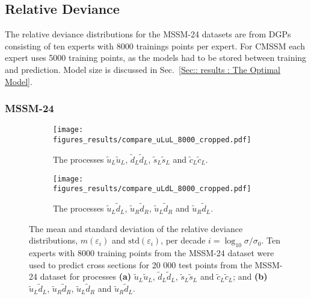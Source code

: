\documentclass[twoside,english]{uiofysmaster}
\begin{document}
{\subsection{Relative Deviance}\label{Sec:: results : Relative Deviance}

The relative deviance distributions for the MSSM-24 datasets are from DGPs consisting of ten experts with 8000 trainings points per expert. For CMSSM each expert uses 5000 training points, as the models had to be stored between training and prediction. Model size is discussed in Sec.~\ref{Sec:: results : The Optimal Model}.

\subsubsection{MSSM-24}

\begin{figure}
    \centering
    \begin{subfigure}[b]{0.9\textwidth}
        \texttt{[image: figures\_results/compare\_uLuL\_8000\_cropped.pdf]}
        \caption{The processes $\widetilde{u}_L \widetilde{u}_L$, $\widetilde{d}_L \widetilde{d}_L$, $\widetilde{s}_L \widetilde{s}_L$ and $\widetilde{c}_L \widetilde{c}_L$.}
        \label{Fig:: results : RD MSSM-24 uLuL}
    \end{subfigure}
    \begin{subfigure}[b]{0.9\textwidth}
        \texttt{[image: figures\_results/compare\_uLdL\_8000\_cropped.pdf]}
        \caption{The processes $\widetilde{u}_L\widetilde{d}_L$, $\widetilde{u}_R\widetilde{d}_R$, $\widetilde{u}_L\widetilde{d}_R$ and $\widetilde{u}_R\widetilde{d}_L$.}
        \label{Fig :: results : RD MSSM-24 uLdL}
    \end{subfigure}
    \caption{The mean and standard deviation of the relative deviance distributions, $m(\varepsilon_i)$ and $\mathrm{std}(\varepsilon_i)$, per decade $i =\log_{10} \sigma / \sigma_0$. Ten experts with 8000 training points from the MSSM-24 dataset were used to predict cross sections for 20 000 test points from the MSSM-24 dataset for processes \textbf{(a)}  $\widetilde{u}_L \widetilde{u}_L$, $\widetilde{d}_L \widetilde{d}_L$, $\widetilde{s}_L \widetilde{s}_L$ and $\widetilde{c}_L \widetilde{c}_L$; and \textbf{(b)} $\widetilde{u}_L\widetilde{d}_L$, $\widetilde{u}_R\widetilde{d}_R$, $\widetilde{u}_L\widetilde{d}_R$ and $\widetilde{u}_R\widetilde{d}_L$. }
\label{Fig:: results : RD MSSM-24}
\end{figure}

}
\end{document}
